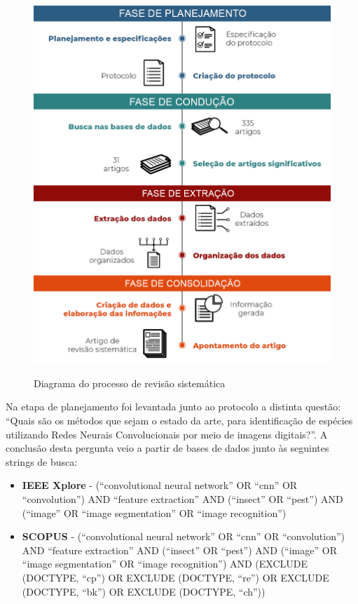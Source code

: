 \documentclass[
	12pt,				%
	oneside,			%
	a4paper,			%
	english,			%
	brazil				%
	]{abntex2ppgsi}
\begin{document}
\begin{figure}[H]
    \centering
    \caption{Diagrama do processo de revisão sistemática}
    \includegraphics[scale=.35]{imagens/processo_revisao_sistematica.jpg}
    \label{fig:processo_revisao_sistematica}
\end{figure}

Na etapa de planejamento foi levantada junto ao protocolo a distinta questão:
``Quais são os métodos que sejam o estado da arte, para identificação de espécies utilizando Redes Neurais Convolucionais por meio de imagens digitais?''.
A conclusão desta pergunta veio a partir de bases de dados junto às seguintes strings de busca:

\begin{itemize}
  \item \textbf{IEEE Xplore} - (``convolutional neural network'' OR ``cnn'' OR ``convolution'') AND ``feature extraction'' AND (``insect'' OR ``pest'') AND (``image'' OR ``image segmentation'' OR ``image recognition'')
  \item \textbf{SCOPUS} - (``convolutional neural network'' OR ``cnn'' OR ``convolution'') AND ``feature extraction'' AND (``insect'' OR ``pest'') AND (``image'' OR ``image segmentation'' OR ``image recognition'') AND (EXCLUDE (DOCTYPE, ``cp'') OR EXCLUDE (DOCTYPE, ``re'') OR EXCLUDE (DOCTYPE, ``bk'') OR EXCLUDE (DOCTYPE, ``ch''))
\end{itemize}
\end{document}
